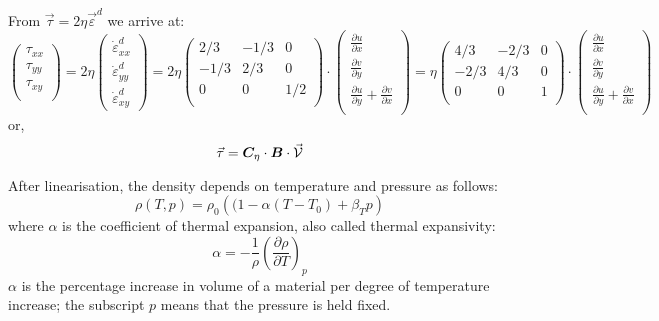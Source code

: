 \documentclass[a4paper,12pt]{article}
\begin{document}
From $\vec{\tau} = 2\eta \vec{\varepsilon}^d$ we arrive at:
\[
\left(
\begin{array}{c}
\tau_{xx}\\
\tau_{yy}\\
\tau_{xy}\\
\end{array}
\right)
=
2\eta
\left(
\begin{array}{c}
\dot{\varepsilon}_{xx}^d \\
\dot{\varepsilon}_{yy}^d \\
\dot{\varepsilon}_{xy}^d 
\end{array}
\right)
=2 \eta
\left(
\begin{array}{ccc}
2/3 & -1/3& 0 \\
-1/3 & 2/3 & 0 \\
0 & 0 & 1/2 \\
\end{array}
\right)
\cdot 
\left(
\begin{array}{c}
\frac{\partial u}{\partial x} \\ 
\frac{\partial v}{\partial y} \\ 
\frac{\partial u}{\partial y}\! +\! \frac{\partial v}{\partial x} \\
\end{array}
\right)
=
\eta
\left(
\begin{array}{ccc}
4/3 & -2/3& 0 \\
-2/3 & 4/3 & 0 \\
0 & 0 & 1 \\
\end{array}
\right)
\cdot 
\left(
\begin{array}{c}
\frac{\partial u}{\partial x} \\ 
\frac{\partial v}{\partial y} \\ 
\frac{\partial u}{\partial y}\! +\! \frac{\partial v}{\partial x} \\
\end{array}
\right)
\]
or, 
\[
\vec{\tau} = {\bm C}_\eta \cdot  {\bm B} \cdot \vec{\cal V}
\]


After linearisation, the density depends on temperature and pressure as follows:
\[
\rho(T,p) = \rho_0 \left((1 - \alpha(T-T_0) + \beta_T p \right)
\]
where $\alpha$ is the coefficient of thermal expansion, also called 
thermal expansivity: 
\[
\alpha=-\frac{1}{\rho}\left( \frac{\partial \rho}{\partial T} \right)_p
\]
$\alpha$ is the percentage increase in volume of a material per degree of temperature increase; the
subscript $p$ means that the pressure is held fixed.
\end{document}
